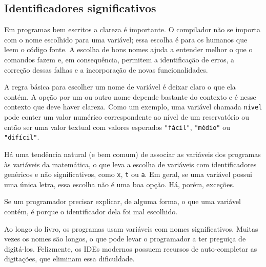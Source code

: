 \documentclass[
  11pt,
  a4paper,
]{scrbook}
\begin{document}
\subsection{Identificadores
significativos}\label{identificadores-significativos}

Em programas bem escritos a clareza é importante. O compilador não se
importa com o nome escolhido para uma variável; essa escolha é para os
humanos que leem o código fonte. A escolha de bons nomes ajuda a
entender melhor o que o comandos fazem e, em consequência, permitem a
identificação de erros, a correção dessas falhas e a incorporação de
novas funcionalidades.

A regra básica para escolher um nome de variável é deixar claro o que
ela contém. A opção por um ou outro nome depende bastante do contexto e
é nesse contexto que deve haver clareza. Como um exemplo, uma variável
chamada \texttt{nível} pode conter um valor numérico correspondente ao
nível de um reservatório ou então ser uma valor textual com valores
esperados \texttt{"fácil"}, \texttt{"médio"} ou \texttt{"difícil"}.

Há uma tendência natural (e bem comum) de associar as variáveis dos
programas às variáveis da matemática, o que leva a escolha de variáveis
com identificadores genéricos e não significativos, como \texttt{x},
\texttt{t} ou \texttt{a}. Em geral, se uma variável possui uma única
letra, essa escolha não é uma boa opção. Há, porém, exceções.

\begin{tcolorbox}[enhanced jigsaw, arc=.35mm, bottomtitle=1mm, colbacktitle=quarto-callout-tip-color!10!white, title=\textcolor{quarto-callout-tip-color}{\faLightbulb}\hspace{0.5em}{Dica}, toprule=.15mm, left=2mm, opacityback=0, colback=white, colframe=quarto-callout-tip-color-frame, opacitybacktitle=0.6, bottomrule=.15mm, leftrule=.75mm, toptitle=1mm, coltitle=black, titlerule=0mm, rightrule=.15mm, breakable]

Se um programador precisar explicar, de alguma forma, o que uma variável
contém, é porque o identificador dela foi mal escolhido.

\end{tcolorbox}

Ao longo do livro, os programas usam variáveis com nomes significativos.
Muitas vezes os nomes são longos, o que pode levar o programador a ter
preguiça de digitá-los. Felizmente, os IDEs modernos possuem recursos de
auto-completar as digitações, que eliminam essa dificuldade.
\end{document}
